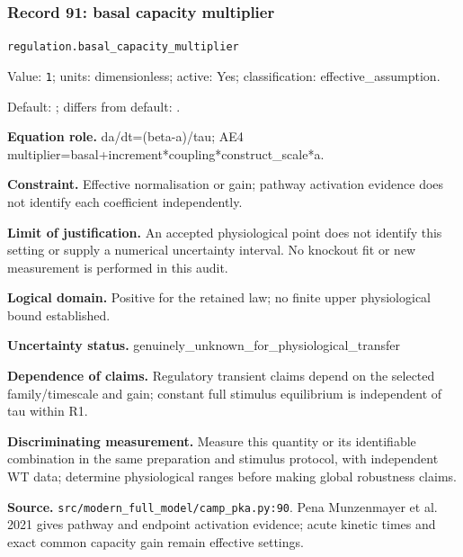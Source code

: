 \subsubsection*{Record 91: basal capacity multiplier}
{\small \nolinkurl{regulation.basal_capacity_multiplier}\par

Value: \texttt{1}; units: dimensionless; active: Yes; classification: effective\_assumption.\par

Default: ; differs from default: .\par

\textbf{Equation role.} da/dt=(beta-a)/tau; AE4 multiplier=basal+increment*coupling*construct\_scale*a.\par

\textbf{Constraint.} Effective normalisation or gain; pathway activation evidence does not identify each coefficient independently.\par

\textbf{Limit of justification.} An accepted physiological point does not identify this setting or supply a numerical uncertainty interval. No knockout fit or new measurement is performed in this audit.\par

\textbf{Logical domain.} Positive for the retained law; no finite upper physiological bound established.\par

\textbf{Uncertainty status.} genuinely\_unknown\_for\_physiological\_transfer\par

\textbf{Dependence of claims.} Regulatory transient claims depend on the selected family/timescale and gain; constant full stimulus equilibrium is independent of tau within R1.\par

\textbf{Discriminating measurement.} Measure this quantity or its identifiable combination in the same preparation and stimulus protocol, with independent WT data; determine physiological ranges before making global robustness claims.\par

\textbf{Source.} \nolinkurl{src/modern_full_model/camp_pka.py:90}. Pena Munzenmayer et al. 2021 gives pathway and endpoint activation evidence; acute kinetic times and exact common capacity gain remain effective settings.\par}


